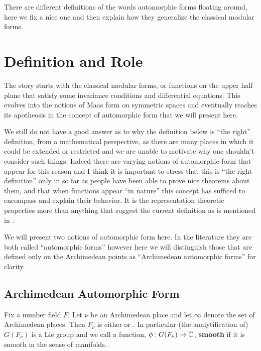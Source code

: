 There are different definitions of the words automorphic forms floating around, here we fix a nice one and then explain how they generalize the classical modular forms.

\section{Definition and Role}
The story starts with the classical modular forms, or functions on the upper half plane that satisfy some invariance conditions and differential equations. This evolves into the notions of Maas form on symmetric spaces and eventually reaches its apotheosis in the concept of automorphic form that we will present here. 

We still do not have a good answer as to why the definition below is ``the right'' definition, from a mathematical perspective, as there are many places in which it could be extended or restricted and we are unable to motivate why one shouldn't consider such things. Indeed there are varying notions of automorphic form that appear for this reason and I think it is important to stress that this is ``the right definition'' only in so far as people have been able to prove nice theorems about them, and that when functions appear ``in nature'' this concept has sufficed to encompass and explain their behavior. It is the representation theoretic properties more than anything that suggest the current definition as is mentioned in \cite[1.II.3]{borelAutomorphicFormsRepresentations1979}.

We will present two notions of automorphic form here. In the literature they are both called ``automorphic forms'' however here we will distinguish those that are defined only on the Archimedean points as ``Archimedean automorphic forms'' for clarity.

\subsection{Archimedean Automorphic Form}
Fix a number field \(F\). Let \(\nu\) be an Archimedean place and let \(\infty\) denote the set of Archimedean places. Then \(F_\nu\) is either \R or \C. In particular (the analytification of) \(G(F_\nu)\) is a Lie group and we call a function, \(\phi: G(F_\nu) \to \C\), \textbf{smooth}  if it is smooth in the sense of manifolds.


